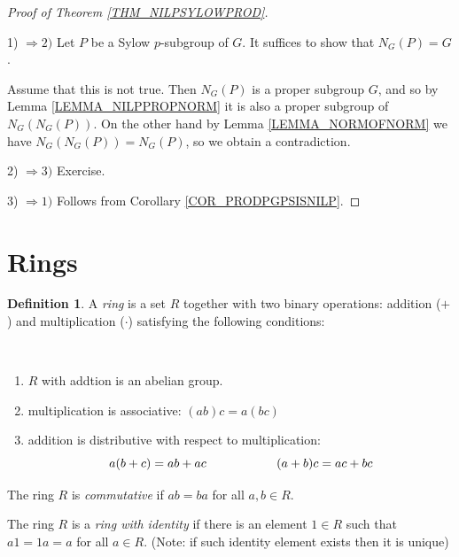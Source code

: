 \documentclass[12pt, letterpaper, oneside]{article}
\theoremstyle{plain}
\theoremstyle{definition}
\newtheorem{definition}[theorem]{Definition}
\newcommand{\benu}{\begin{enumerate}}
\newcommand{\eenu}{\end{enumerate}}
\newcommand{\vs}{\vskip 5mm}
\newcommand{\isep}[1][0]{\setlength{\itemsep}{#1 mm}}
\begin{document}
\begin{proof}[Proof of Theorem \ref{THM_NILPSYLOWPROD}]  \ 


1) $\Rightarrow 2)$ Let $P$ be a Sylow $p$-subgroup of $G$. It suffices 
to show that $N_{G}(P) = G$. 

Assume that this is not true. Then $N_{G}(P)$ is a proper subgroup $G$, and 
so by Lemma \ref{LEMMA_NILPPROPNORM}  it is also a proper subgroup of 
$N_{G}(N_{G}(P))$. On the other hand by Lemma \ref{LEMMA_NORMOFNORM}
we have $N_{G}(N_{G}(P)) = N_{G}(P)$, so we obtain a contradiction.

\vs

2) $\Rightarrow 3)$ Exercise.

\vs

3) $\Rightarrow 1)$ Follows from Corollary \ref{COR_PRODPGPSISNILP}. 

\end{proof}







\newpage
\section{Rings}
\label{SEC_RINGS}


\begin{definition}
A \emph{ring} is a set $R$ together with two binary operations: addition ($+$) and multiplication
($\cdot$) satisfying the following conditions:

\vskip -13mm

\ 
\benu
\isep
\item $R$ with addtion is an abelian group. 
\item multiplication is associative: $( ab)c  = a(bc)$
\item addition is distributive with respect to multiplication:
$$a (b +c) = ab + ac \hskip 20mm (a +b)c = ac + bc$$
\eenu 

The ring $R$ is \emph{commutative} if $ab=ba$ for all $a, b\in R$.

The ring $R$ is a \emph{ring with identity} if there is an element $1 \in R$
such that $a1  = 1a = a$ for all $a\in R$. (Note: if such identity element 
exists  then it is unique) 
\end{definition}
\end{document}
